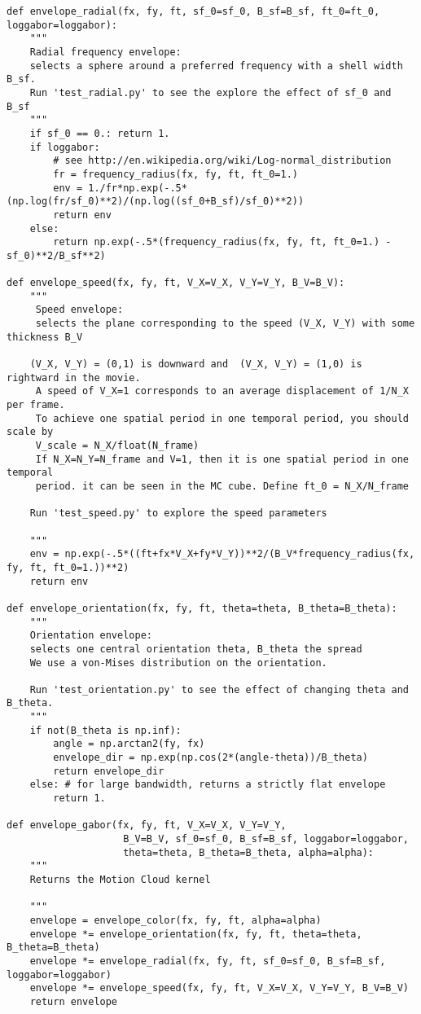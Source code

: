 \documentclass[a4paper,11pt]{article}%
\begin{document}
\begin{lstlisting}
def envelope_radial(fx, fy, ft, sf_0=sf_0, B_sf=B_sf, ft_0=ft_0, loggabor=loggabor):
    """
    Radial frequency envelope:
    selects a sphere around a preferred frequency with a shell width B_sf.
    Run 'test_radial.py' to see the explore the effect of sf_0 and B_sf
    """
    if sf_0 == 0.: return 1.
    if loggabor:
        # see http://en.wikipedia.org/wiki/Log-normal_distribution
        fr = frequency_radius(fx, fy, ft, ft_0=1.)
        env = 1./fr*np.exp(-.5*(np.log(fr/sf_0)**2)/(np.log((sf_0+B_sf)/sf_0)**2))
        return env
    else:
        return np.exp(-.5*(frequency_radius(fx, fy, ft, ft_0=1.) - sf_0)**2/B_sf**2)

def envelope_speed(fx, fy, ft, V_X=V_X, V_Y=V_Y, B_V=B_V):
    """
     Speed envelope:
     selects the plane corresponding to the speed (V_X, V_Y) with some thickness B_V

    (V_X, V_Y) = (0,1) is downward and  (V_X, V_Y) = (1,0) is rightward in the movie.
     A speed of V_X=1 corresponds to an average displacement of 1/N_X per frame.
     To achieve one spatial period in one temporal period, you should scale by
     V_scale = N_X/float(N_frame)
     If N_X=N_Y=N_frame and V=1, then it is one spatial period in one temporal
     period. it can be seen in the MC cube. Define ft_0 = N_X/N_frame

    Run 'test_speed.py' to explore the speed parameters

    """
    env = np.exp(-.5*((ft+fx*V_X+fy*V_Y))**2/(B_V*frequency_radius(fx, fy, ft, ft_0=1.))**2)
    return env

def envelope_orientation(fx, fy, ft, theta=theta, B_theta=B_theta):
    """
    Orientation envelope:
    selects one central orientation theta, B_theta the spread
    We use a von-Mises distribution on the orientation.

    Run 'test_orientation.py' to see the effect of changing theta and B_theta.
    """
    if not(B_theta is np.inf):
        angle = np.arctan2(fy, fx)
        envelope_dir = np.exp(np.cos(2*(angle-theta))/B_theta)
        return envelope_dir
    else: # for large bandwidth, returns a strictly flat envelope
        return 1.

def envelope_gabor(fx, fy, ft, V_X=V_X, V_Y=V_Y,
                    B_V=B_V, sf_0=sf_0, B_sf=B_sf, loggabor=loggabor,
                    theta=theta, B_theta=B_theta, alpha=alpha):
    """
    Returns the Motion Cloud kernel

    """
    envelope = envelope_color(fx, fy, ft, alpha=alpha)
    envelope *= envelope_orientation(fx, fy, ft, theta=theta, B_theta=B_theta)
    envelope *= envelope_radial(fx, fy, ft, sf_0=sf_0, B_sf=B_sf, loggabor=loggabor)
    envelope *= envelope_speed(fx, fy, ft, V_X=V_X, V_Y=V_Y, B_V=B_V)
    return envelope


\end{lstlisting}
\end{document}
